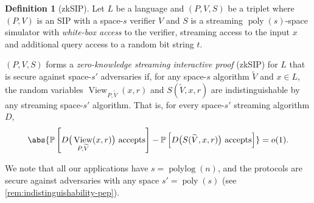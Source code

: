 \documentclass[a4paper,UKenglish,cleveref, autoref, thm-restate]{lipics-v2021}
\theoremstyle{definition}
\newtheorem{definition}[theorem]{Definition}
\newcommand{\zksip}{\textrm{zkSIP}}
\DeclareMathOperator{\view}{View}
\renewcommand{\P}{\mathbb P}
\newcommand{\poly}{\operatorname{poly}}
\newcommand{\polylog}{\operatorname{polylog}}
\begin{document}
\begin{definition}[zkSIP]
\label{def:streaming-zk}
    Let $L$ be a language and $(P,V,S)$ be a triplet where $(P,V)$ is an SIP with a space-$s$ verifier $V$ and $S$ is a streaming $\poly(s)$-space simulator with \emph{white-box access} to the verifier, streaming access to the input $x$ and additional query access to a random bit string $t$.
    
    $(P,V,S)$ forms a \emph{zero-knowledge streaming interactive proof} (\zksip{}) for $L$ that is secure against space-$s'$ adversaries if, for any space-$s$ algorithm $\widetilde V$ and $x\in L$, the random variables $\view_{P,\widetilde V}(x, r)$ and $S(\widetilde V, x, r)$ are indistinguishable by any streaming space-$s'$ algorithm. That is, for every space-$s'$ streaming algorithm $D$,
    \begin{equation*}
        \abs{\P\left[D\big(\view_{P,\widetilde V}(x, r)\big) \text{ accepts}\right] - \P\left[D\big(S(\widetilde V, x, r)\big) \text{ accepts}\right]} = o(1).
    \end{equation*}
\end{definition}

We note that all our applications have $s = \polylog(n)$, and the protocols are secure against adversaries with any space $s' = \poly(s)$ (see \cref{rem:indistinguishability-pep}).
\end{document}
